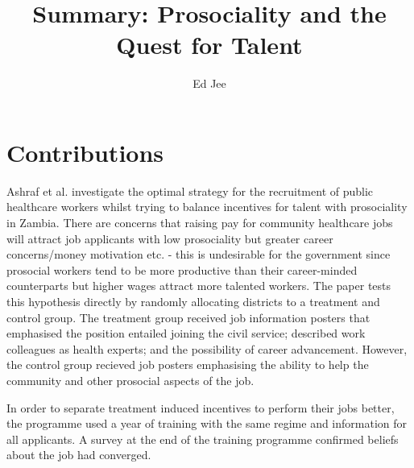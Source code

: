 \documentclass{article}
\author{Ed Jee}
\title{Summary: Prosociality and the Quest for Talent}
\begin{document}
\maketitle 


\section*{Contributions}


Ashraf et al. investigate the optimal strategy for the recruitment of public 
healthcare workers whilst trying to balance incentives for talent with prosociality 
in Zambia.
There are concerns that raising pay for community healthcare jobs will attract job applicants 
with low prosociality but greater career concerns/money motivation etc. - this 
is undesirable for the government since prosocial workers tend to be more 
productive than their career-minded counterparts but higher wages attract 
more talented workers. The paper tests this 
hypothesis directly by randomly allocating districts to a treatment and control 
group. The treatment group received job information posters that emphasised the 
position entailed joining the civil service; described work colleagues as 
health experts; and the possibility of career advancement. However, the control 
group recieved job posters emphasising the ability to help the community and 
other prosocial aspects of the job.


In order to separate treatment induced incentives to perform their jobs better, 
the programme used a year of training with the same regime and information for all applicants.
A survey at the end of the training programme confirmed beliefs about the job 
had converged.
\end{document}
